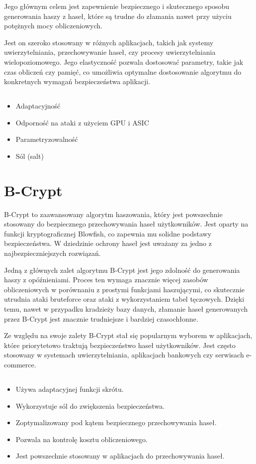 \documentclass{article}
\begin{document}
\begin{enumerate}
    Jego głównym celem jest zapewnienie bezpiecznego i skutecznego sposobu generowania haszy z haseł, które są trudne do złamania nawet przy użyciu potężnych mocy obliczeniowych.
    
    Jest on szeroko stosowany w różnych aplikacjach, takich jak systemy uwierzytelniania, przechowywanie haseł, czy procesy uwierzytelniania wielopoziomowego. Jego elastyczność pozwala dostosować parametry, takie jak czas obliczeń czy pamięć, co umożliwia optymalne dostosowanie algorytmu do konkretnych wymagań bezpieczeństwa aplikacji.

\subsection*{}
    \begin{itemize}
        \item Adaptacyjność
        \item Odporność na ataki z użyciem GPU i ASIC
        \item Parametryzowalność
        \item Sól (salt)
    \end{itemize}

\section*{B-Crypt} 
    B-Crypt to zaawansowany algorytm haszowania, który jest powszechnie stosowany do bezpiecznego przechowywania haseł użytkowników. Jest oparty na funkcji kryptograficznej Blowfish, co zapewnia mu solidne podstawy bezpieczeństwa. W dziedzinie ochrony haseł jest uważany za jedno z najbezpieczniejszych rozwiązań.

    Jedną z głównych zalet algorytmu B-Crypt jest jego zdolność do generowania haszy z opóźnieniami. Proces ten wymaga znacznie więcej zasobów obliczeniowych w porównaniu z prostymi funkcjami haszującymi, co skutecznie utrudnia ataki bruteforce oraz ataki z wykorzystaniem tabel tęczowych. Dzięki temu, nawet w przypadku kradzieży bazy danych, złamanie haseł generowanych przez B-Crypt jest znacznie trudniejsze i bardziej czasochłonne.

    Ze względu na swoje zalety B-Crypt stał się popularnym wyborem w aplikacjach, które priorytetowo traktują bezpieczeństwo haseł użytkowników. Jest często stosowany w systemach uwierzytelniania, aplikacjach bankowych czy serwisach e-commerce. 
\subsection*{}
    \begin{itemize}
        \item Używa adaptacyjnej funkcji skrótu.
        \item Wykorzystuje sól do zwiększenia bezpieczeństwa.
        \item Zoptymalizowany pod kątem bezpiecznego przechowywania haseł.
        \item Pozwala na kontrolę kosztu obliczeniowego.
        \item Jest powszechnie stosowany w aplikacjach do przechowywania haseł.
    \end{itemize}


\end{enumerate}
\end{document}
